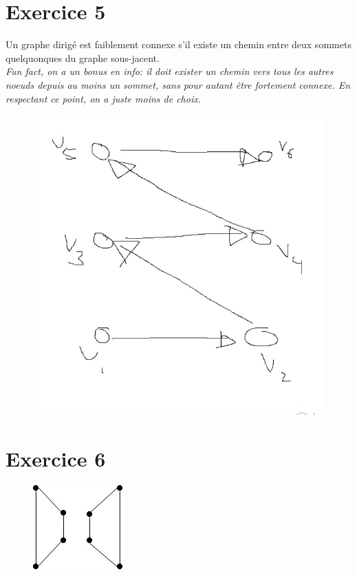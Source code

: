 \documentclass[fontsize=10pt]{article}
\begin{document}
\section*{Exercice 5}
Un graphe dirigé est faiblement connexe s'il existe un chemin entre deux sommets quelquonques du graphe sous-jacent.\\
\textit{Fun fact, on a un bonus en info: il doit exister un chemin vers tous les autres noeuds depuis au moins un sommet, sans pour autant être fortement connexe. En respectant ce point, on a juste moins de choix.} 
\begin{figure}[hbtp]
\centering
\includegraphics[scale=0.2]{TP5Exo5.jpg}
\end{figure}

\section*{Exercice 6}

\begin{figure}[hbtp]
\centering
\includegraphics[scale=1]{TP5Exo6.jpg}
\end{figure}
\end{document}
